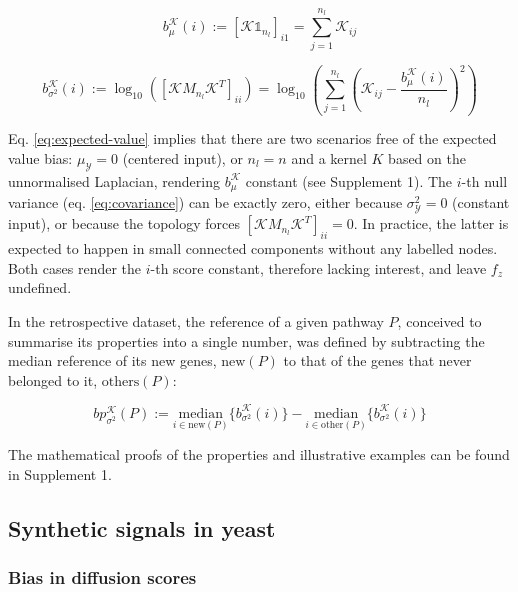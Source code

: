 \documentclass[final]{bioinfo}
\newcommand{\ebias}{b_{\mu}^{\mathcal{K}}}
\newcommand{\vbias}{b_{\sigma^2}^{\mathcal{K}}}
\newcommand{\pbias}{bp_{\sigma^2}^{\mathcal{K}}}
\begin{document}
\begin{equation}\label{eq:bias-e}
    \ebias(i) := [\mathcal{K} \mathbb{1}_{n_l}]_{i1} = \sum_{j = 1}^{n_l} \mathcal{K}_{ij}
\end{equation}

\begin{equation}\label{eq:bias-var}
    \vbias(i) := \log_{10} \left(\left[\mathcal{K} M_{n_l} \mathcal{K}^T\right]_{ii}\right) = \log_{10} \left( \sum_{j = 1}^{n_l} \left(\mathcal{K}_{ij} - \frac{\ebias(i)}{n_l} \right)^2 \right)
\end{equation}

Eq. \ref{eq:expected-value} implies that there are two scenarios free of the expected value bias: $\mu_{\mathcal{Y}} = 0$ (centered input), or $n_l = n$ and a kernel $K$ based on the unnormalised Laplacian, rendering $\ebias$ constant (see Supplement 1).
The $i$-th null variance (eq. \ref{eq:covariance}) can be exactly zero, either because $\sigma_{\mathcal{Y}}^2 = 0$ (constant input), or because the topology forces $[\mathcal{K} M_{n_l} \mathcal{K}^T]_{ii} = 0$.
In practice, the latter is expected to happen in small connected components without any labelled nodes.
Both cases render the $i$-th score constant, therefore lacking interest, and leave $f_z$ undefined.

In the retrospective dataset, the reference of a given pathway $P$, conceived to summarise its properties into a single number, was defined by subtracting the median reference of its new genes, $\textrm{new}(P)$ to that of the genes that never belonged to it, $\textrm{others}(P)$:

\begin{equation}\label{eq:bias-var-pathway}
    \pbias(P) := \underset{i \in \textrm{new}(P)}{\textrm{median}}\{\vbias(i)\} - \underset{i \in \textrm{other}(P)}{\textrm{median}}\{\vbias(i)\}
\end{equation}

The mathematical proofs of the properties and illustrative examples can be found in Supplement 1. 

\subsection*{Synthetic signals in yeast}

\subsubsection*{Bias in diffusion scores}
\end{document}
